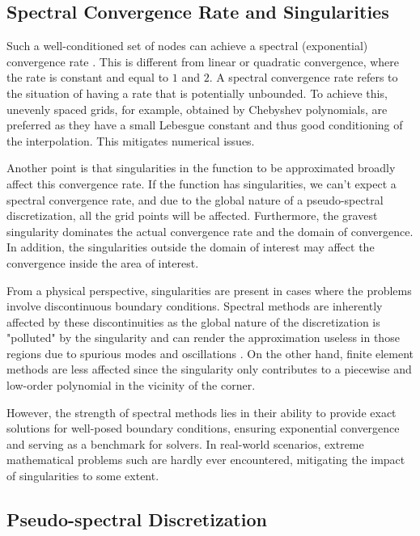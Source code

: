 \subsection{Spectral Convergence Rate and Singularities}

Such a well-conditioned set of nodes can achieve a spectral (exponential)
convergence rate \citep{meseguer2020}. This is different from linear or
quadratic convergence, where the rate is constant and equal to $1$ and $2$. A
spectral convergence rate refers to the situation of having a rate that is
potentially unbounded. To achieve this, unevenly spaced grids, for example,
obtained by Chebyshev polynomials, are preferred as they have a small Lebesgue
constant and thus good conditioning of the interpolation. This mitigates
numerical issues. 

Another point is that singularities in the function to be approximated broadly
affect this convergence rate. If the function has singularities, we can't
expect a spectral convergence rate, and due to the global nature of a
pseudo-spectral discretization, all the grid points will be affected.
Furthermore, the gravest singularity dominates the actual convergence rate and
the domain of convergence. In addition, the singularities outside the domain of
interest may affect the convergence inside the area of interest. 

From a physical perspective, singularities are present in cases where the
problems involve discontinuous boundary conditions. Spectral methods are
inherently affected by these discontinuities as the global nature of the
discretization is "polluted" by the singularity and can render the
approximation useless in those regions due to spurious modes and oscillations
\citep{canuto2006}. On the other hand, finite element methods are less affected
since the singularity only contributes to a piecewise and low-order polynomial
in the vicinity of the corner.

However, the strength of spectral methods lies in their ability to provide
exact solutions for well-posed boundary conditions, ensuring exponential
convergence and serving as a benchmark for solvers. In real-world scenarios,
extreme mathematical problems such are hardly ever encountered, mitigating the
impact of singularities to some extent.

\subsection{Pseudo-spectral Discretization}

